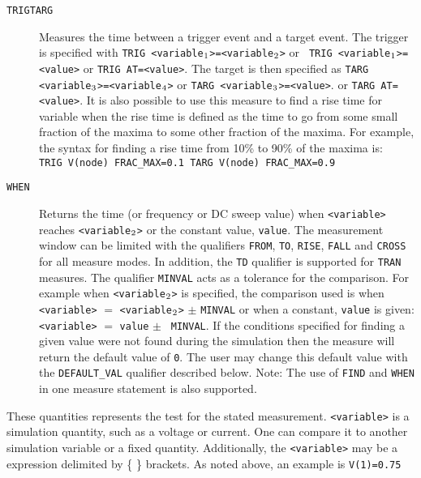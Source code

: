 \begin{Command}
\begin{Arguments}
\begin{description}
  \item[\vbox{\hbox{\tt TRIG\hfil}\hbox{\tt TARG\hfil}}] Measures the
    time between a trigger event and a target event.  The trigger is
    specified with {\tt TRIG <variable\(\sb{1}\)>=<variable\(\sb{2}\)>} or {\tt
    TRIG <variable\(\sb{1}\)>=<value>} or {\tt TRIG AT=<value>}.  The
    target is then specified as {\tt TARG
    <variable\(\sb{3}\)>=<variable\(\sb{4}\)>} or {\tt TARG <variable\(\sb{3}\)>=<value>}.
    or {\tt TARG AT=<value>}.  It is also possible to use this
    measure to find a rise time for variable when the rise time is
    defined as the time to go from some small fraction of the maxima
    to some other fraction of the maxima.  For example, the syntax for
    finding a rise time from 10\% to 90\% of the maxima
    is:\\ \texttt{TRIG V(node) FRAC\_MAX=0.1 TARG V(node)
    FRAC\_MAX=0.9}

  \item[\tt WHEN] Returns the time (or frequency or DC sweep value) when
    {\tt <variable>} reaches {\tt <variable\(\sb{2}\)>} or the constant
    value, {\tt value}.  The measurement window can be limited with the
    qualifiers {\tt FROM}, {\tt TO}, {\tt RISE}, {\tt FALL} and {\tt CROSS}
    for all measure modes.  In addition, the {\tt TD} qualifier is supported
    for {\tt TRAN} measures. The qualifier {\tt MINVAL} acts as a
    tolerance for the comparison.  For example when {\tt <variable\(\sb{2}\)>}
    is specified, the comparison used is when {\tt <variable>} $=$
    {\tt <variable\(\sb{2}\)>} $\pm$ {\tt MINVAL} or when a constant,
    {\tt value} is given: {\tt <variable>} $=$ {\tt value} $\pm$ {\tt
    MINVAL}.  If the conditions specified for finding a given value
    were not found during the simulation then the measure will return
    the default value of {\tt 0}.  The user may change this default
    value with the {\tt DEFAULT\_VAL} qualifier described below.
    Note: The use of {\tt FIND} and {\tt WHEN} in one measure
    statement is also supported.
\end{description}


These quantities represents the test for the stated
measurement.  \texttt{<variable>} is a simulation quantity, such as a
voltage or current.  One can compare it to another simulation variable
or a fixed quantity.  Additionally, the \texttt{<variable>} may be
a \Xyce{} expression delimited by \{ \} brackets.  As noted above, an
example is {\tt V(1)=0.75}


\end{Arguments}
\end{Command}
